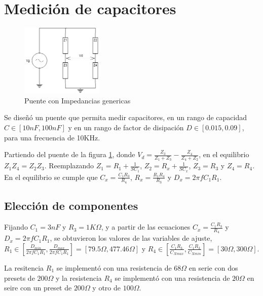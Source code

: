 \documentclass[../../main.tex]{subfiles}
\begin{document}
\section{Medición de capacitores}

\begin{figure}[H]	
	\centering
	\includegraphics[width=0.35\textwidth]{fotos/PuenteGen.png}
	\caption{Puente con Impedancias genericas} \label{fig:pgc}
\end{figure}

Se diseñó un puente que permita medir capacitores, en un rango de capacidad $C \in [10nF,100nF]$ y en un rango de factor de disipación $D \in[0.015 , 0.09 ] $, para una frecuencia de 10KHz. 
\par Partiendo del puente de la figura \ref{fig:pgc}, donde $V_d=\frac{Z_3}{Z_1+Z_3} -\frac{Z_4}{Z_4 + Z_2}$, en el equilibrio $Z_1 Z_4 = Z_2  Z_3$.  Reemplazando $Z_1= R_1 + \frac{1}{SC_1}$, $Z_2= R_x + \frac{1}{SC_x}$, $Z_3=R_3$ y $Z_4=R_4$. En el equilibrio se cumple que $C_x=\frac{C_1 R_3}{R_4}$, $R_x=\frac{R_1 R_4}{R_3}$ y $D_x=2 \pi f C_1 R_1$.

\subsection{Elección de componentes}
Fijando $C_1=3nF$ y $R_3=1K \Omega$, y a partir de las ecuaciones  $C_x=\frac{C_1 R_3}{R_4}$ y $D_x=2 \pi f C_1 R_1$, se obtuvieron los valores de las variables de ajuste, $R_1 \in \left[  \frac{D_{min}}{2 \pi f C_1 R_1} ,  \frac{D_{max}}{2 \pi f C_1 R_1}  \right] = \left[ 79.5\Omega , 477.46 \Omega   \right]$ y 
$R_4 \in \left[ \frac{C_1 R_3}{C_{Xmax}} , \frac{C_1 R_3}{C_{Xmin}} \right]=   \left[ 30\Omega , 300 \Omega   \right]$.
\par La resitencia $R_1$ se implementó con una resistencia de $68 \Omega$ en serie con dos presets de $200 \Omega$ y la resistencia $R_4$ se implementó con una resistencia de $20\Omega$ en seire con un preset de $200 \Omega$ y otro de $100 \Omega$.
\end{document}
